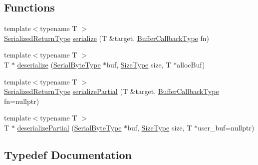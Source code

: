 \subsection*{Functions}
\begin{DoxyCompactItemize}
\item 
{\footnotesize template$<$typename T $>$ }\\\hyperlink{namespaceserialization_1_1interface_a53410d9804c330ddfaf562ddc8e3c681}{Serialized\+Return\+Type} \hyperlink{namespaceserialization_1_1interface_a97404f513117bf528ec47309512815fb}{serialize} (T \&target, \hyperlink{namespaceserialization_1_1interface_ae1f3fc9ceb0366ab6a877a78ee7377a2}{Buffer\+Callback\+Type} fn)
\item 
{\footnotesize template$<$typename T $>$ }\\T $\ast$ \hyperlink{namespaceserialization_1_1interface_a56fb462f661704f6e4fe3ebc77f429a1}{deserialize} (\hyperlink{namespaceserialization_1_1interface_a718748616a908c35e6080b71d7790a76}{Serial\+Byte\+Type} $\ast$buf, \hyperlink{namespaceserialization_1_1interface_a2ffaaa9b168f9cbcfe454ab036444403}{Size\+Type} size, T $\ast$alloc\+Buf)
\item 
{\footnotesize template$<$typename T $>$ }\\\hyperlink{namespaceserialization_1_1interface_a53410d9804c330ddfaf562ddc8e3c681}{Serialized\+Return\+Type} \hyperlink{namespaceserialization_1_1interface_a358f5ea6192243a92aa7a7c9efc2ea4d}{serialize\+Partial} (T \&target, \hyperlink{namespaceserialization_1_1interface_ae1f3fc9ceb0366ab6a877a78ee7377a2}{Buffer\+Callback\+Type} fn=nullptr)
\item 
{\footnotesize template$<$typename T $>$ }\\T $\ast$ \hyperlink{namespaceserialization_1_1interface_a08efd64c2c86ef556fd0a2683b9105d6}{deserialize\+Partial} (\hyperlink{namespaceserialization_1_1interface_a718748616a908c35e6080b71d7790a76}{Serial\+Byte\+Type} $\ast$buf, \hyperlink{namespaceserialization_1_1interface_a2ffaaa9b168f9cbcfe454ab036444403}{Size\+Type} size, T $\ast$user\+\_\+buf=nullptr)
\end{DoxyCompactItemize}


\subsection{Typedef Documentation}
\mbox{\label{namespaceserialization_1_1interface_ae1f3fc9ceb0366ab6a877a78ee7377a2}} 
